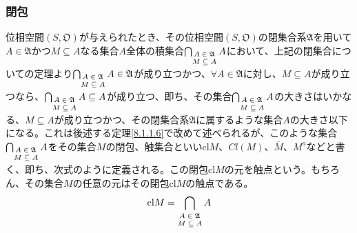 \documentclass[dvipdfmx]{jsarticle}
\begin{document}
\subsubsection{閉包}%
\begin{dfn}
位相空間$\left( S,\mathfrak{O} \right)$が与えられたとき、その位相空間$\left( S,\mathfrak{O} \right)$の閉集合系$\mathfrak{A}$を用いて$A \in \mathfrak{A}$かつ$M \subseteq A$なる集合$A$全体の積集合$\bigcap_{\scriptsize \begin{matrix}
A \in \mathfrak{A} \\
M \subseteq A \\
\end{matrix}} A$において、上記の閉集合についての定理より$\bigcap_{\scriptsize \begin{matrix}
A \in \mathfrak{A} \\
M \subseteq A \\
\end{matrix}} A\in \mathfrak{A}$が成り立つかつ、$\forall A \in \mathfrak{A}$に対し、$M \subseteq A$が成り立つなら、$\bigcap_{\scriptsize \begin{matrix}
A \in \mathfrak{A} \\
M \subseteq A \\
\end{matrix}} A \subseteq A$が成り立つ、即ち、その集合$\bigcap_{\scriptsize \begin{matrix}
A \in \mathfrak{A} \\
M \subseteq A \\
\end{matrix}} A$の大きさはいかなる、$M \subseteq A$が成り立つかつ、その閉集合系$\mathfrak{A}$に属するような集合$A$の大きさ以下になる。これは後述する定理\ref{8.1.1.6}で改めて述べられるが、このような集合$\bigcap_{\scriptsize \begin{matrix}
A \in \mathfrak{A} \\
M \subseteq A \\
\end{matrix}} A$をその集合$M$の閉包、触集合といい${\mathrm{cl}}M$、$Cl(M)$、$\overline{M}$、$M^{a}$などと書く、即ち、次式のように定義される。この閉包${\mathrm{cl}}M$の元を触点という。もちろん、その集合$M$の任意の元はその閉包${\mathrm{cl}}M$の触点である。
\begin{align*}
{\mathrm{cl}}M = \bigcap_{\scriptsize \begin{matrix}
A \in \mathfrak{A} \\
M \subseteq A \\
\end{matrix}} A
\end{align*}
\end{dfn}\par
\end{document}
